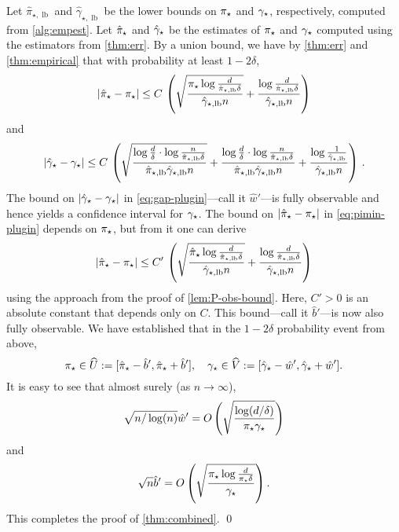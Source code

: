 \newcommand\LB{\ensuremath{\operatorname{lb}}}
\newcommand\piminlb{\ensuremath{\hat\pi_{\star,\LB}}}
\newcommand\gaplb{\ensuremath{\hat\gamma_{\star,\LB}}}
Let $\piminlb$ and $\gaplb$ be the lower bounds on $\pi_{\star}$ and
$\gamma_{\star}$, respectively, computed from \cref{alg:empest}.
Let $\hat\pi_{\star}$ and $\hat\gamma_{\star}$ be the estimates of $\pi_{\star}$ and $\gamma_{\star}$
computed using the estimators from \cref{thm:err}.
By a union bound, we have by \cref{thm:err} and \cref{thm:empirical}
that with probability at least $1-2\delta$,
\begin{equation}
  \Abs{\hatpimin-\pimin}
  \le
  C \,
  \Parens{
    \sqrt{\frac{\pimin\log\frac{d}{\piminlb\delta}}{\gaplb n}}
    +
    \frac{\log\frac{d}{\piminlb\delta}}{\gaplb n}
  }
  \label{eq:pimin-plugin}
\end{equation}
and
\begin{equation}
  \Abs{\hatgap-\gap}
  \leq
  C \,
  \Parens{
    \sqrt{\frac{\log\frac{d}{\delta}\cdot\log\frac{n}{\piminlb\delta}}{\piminlb\gaplb n}}
    +
    \frac{\log\frac{d}{\delta}\cdot\log\frac{n}{\piminlb\delta}}{\piminlb\gaplb n}  
    + \frac{\log\frac{1}{\gaplb}}{\gaplb n}  
  }
  \,.
  \label{eq:gap-plugin}
\end{equation}
The bound on $|\hat\gamma_{\star}-\gamma_{\star}|$ in \cref{eq:gap-plugin}---call it
$\hat{w}'$---is fully observable and hence yields a confidence
interval for $\gamma_{\star}$.
The bound on $|\hat\pi_{\star}-\pi_{\star}|$ in \cref{eq:pimin-plugin}
depends on $\pi_{\star}$, but from it one can derive
\[
  \Abs{\hatpimin-\pimin}
  \le
  C' \,
  \Parens{
    \sqrt{\frac{\hatpimin\log\frac{d}{\piminlb\delta}}{\gaplb n}}
    +
    \frac{\log\frac{d}{\piminlb\delta}}{\gaplb n}
  }
\]
using the approach from the proof of \cref{lem:P-obs-bound}.
Here, $C'>0$ is an absolute constant that depends only on $C$.
This bound---call it $\hat{b}'$---is now also fully observable.
We have established that in the $1-2\delta$ probability event from
above,
\[
  \pi_{\star} \in \widehat{U} := [\hat\pi_{\star}-\hat{b}', \hat\pi_{\star}+\hat{b}']
  , \quad
  \gamma_{\star} \in \widehat{V} := [\hat\gamma_{\star}-\hat{w}', \hat\gamma_{\star}+\hat{w}']
  .
\]
It is easy to see that almost surely (as $n \to \infty$),
\[
  \sqrt{n / \log(n)} \hat{w}'
  = O\left(
    \sqrt{\frac{\log(d/\delta)}{\pi_{\star}\gamma_{\star}}}
  \right)
\]
and
\[
  \sqrt{n} \hat{b}'
  = O\left(
    \sqrt{\frac{\pi_{\star} \log\frac{d}{\pi_{\star}\delta}}{\gamma_{\star}}}
  \right)
  .
\]
This completes the proof of \cref{thm:combined}.
\hfill\qed

